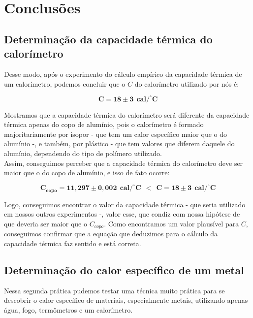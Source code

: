 \newpage
\section{Conclusões}


\subsection{Determinação da capacidade térmica do calorímetro}

Desse modo, após o experimento do cálculo empírico da capacidade térmica de um calorímetro, podemos concluir que o $C$ do calorímetro utilizado por nós é:

\[ \mathbf{ C = 18 \pm 3 \ \  cal/^\circ C}\]

Mostramos que a capacidade térmica do calorímetro será diferente da capacidade térmica apenas do copo de alumínio, pois o calorímetro é formado majoritariamente por isopor - que tem um calor específico maior que o do alumínio -, e também, por plástico - que tem valores que diferem daquele do alumínio, dependendo do tipo de polímero utilizado.\\

Assim, conseguimos perceber que a capacidade térmica do calorímetro deve ser maior que o do copo de alumínio, e isso de fato ocorre:

\[\mathbf{ C_{copo} = 11,297 \pm 0,002 \ \ cal/^\circ C \ \ < \ \ C = 18 \pm 3 \ \ cal/^\circ C}\]

Logo, conseguimos encontrar o valor da capacidade térmica - que seria utilizado em nossos outros experimentos -, valor esse, que condiz com nossa hipótese de que deveria ser maior que o $C_{copo}$. Como encontramos um valor plausível para $C$, conseguimos confirmar que a equação que deduzimos para o cálculo da capacidade térmica faz sentido e está correta.


\subsection{Determinação do calor específico de um metal}

Nessa segunda prática pudemos testar uma técnica muito prática para se descobrir o calor específico de materiais, especialmente metais, utilizando apenas água, fogo, termômetros e um calorímetro.


